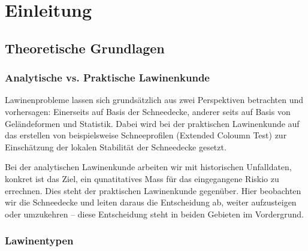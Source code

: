 \section{Einleitung}
\subsection{Theoretische Grundlagen}
\subsubsection{Analytische vs. Praktische Lawinenkunde}
Lawinenprobleme lassen sich grundsätzlich aus zwei Perspektiven betrachten und vorhersagen: Einerseits auf Basis der Schneedecke, anderer seits auf Basis von Geländeformen und Statistik.
Dabei wird bei der praktischen Lawinenkunde auf das erstellen von beispielsweise Schneeprofilen (Extended Coloumn Test) zur Einschätzung der lokalen Stabilität der Schneedecke gesetzt.

Bei der analytischen Lawinenkunde arbeiten wir mit historischen Unfalldaten, konkret ist das Ziel, ein qunatitatives Mass für das eingegangene Riskio zu errechnen.
Dies steht der praktischen Lawinenkunde gegenüber. Hier beobachten wir die Schneedecke und leiten daraus die Entscheidung ab, weiter aufzusteigen oder umzukehren – diese Entscheidung steht in beiden Gebieten im Vordergrund.

\subsubsection{Lawinentypen}

